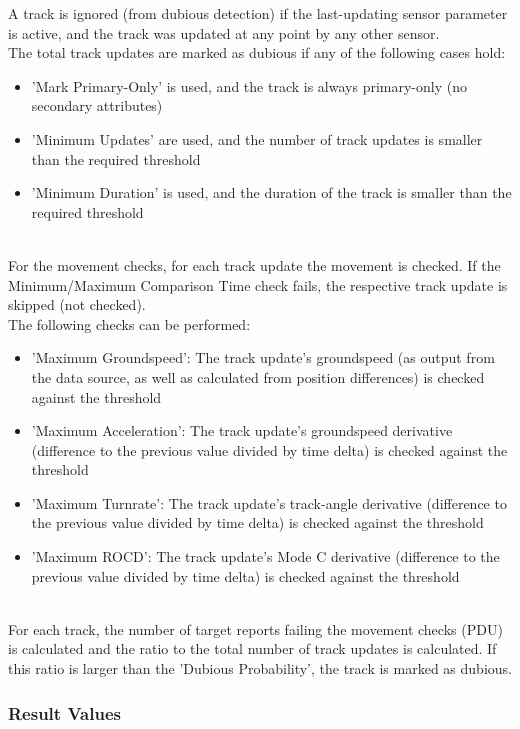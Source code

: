 A track is ignored (from dubious detection) if the last-updating sensor parameter is active, and the track was updated at any point by any other sensor. \\

The total track updates are marked as dubious if any of the following cases hold:
\begin{itemize}  
\item 'Mark Primary-Only' is used, and the track is always primary-only (no secondary attributes)
\item 'Minimum Updates' are used, and the number of track updates is smaller than the required threshold
\item 'Minimum Duration' is used, and the duration of the track is smaller than the required threshold
\end{itemize}
\ \\

For the movement checks, for each track update the movement is checked. If the Minimum/Maximum Comparison Time check fails, the respective track update is skipped (not checked). \\ 

The following checks can be performed:
\begin{itemize}  
\item 'Maximum Groundspeed': The track update's groundspeed (as output from the data source, as well as calculated from position differences) is checked against the threshold
\item 'Maximum Acceleration': The track update's groundspeed derivative (difference to the previous value divided by time delta) is checked against the threshold
\item 'Maximum Turnrate': The track update's track-angle derivative (difference to the previous value divided by time delta) is checked against the threshold
\item 'Maximum ROCD': The track update's Mode C derivative (difference to the previous value divided by time delta) is checked against the threshold
\end{itemize}
\ \\

For each track, the number of target reports failing the movement checks (PDU) is calculated and the ratio to the total number of track updates is calculated. If this ratio is larger than the 'Dubious Probability', the track is marked as dubious.

\subsubsection{Result Values}

